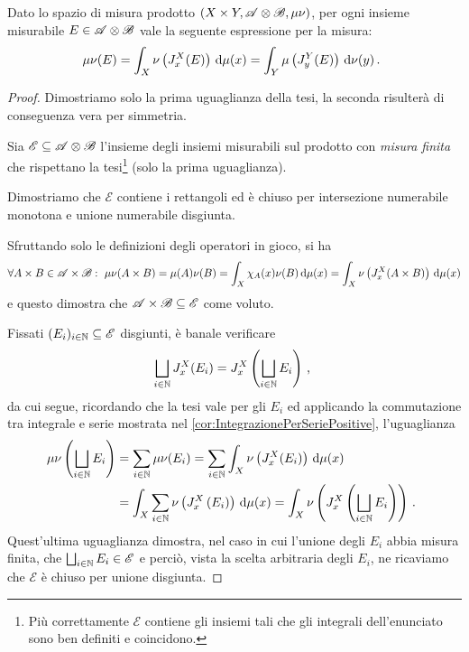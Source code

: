 \begin{proposition}\label{prop:PreTonelli}
	Dato lo spazio di misura prodotto $(X\times Y,\mathscr A\otimes\mathscr B,\mu\nu)$, per ogni insieme misurabile $E\in\mathscr A\otimes\mathscr B$ \sigfin[o] vale la seguente espressione per la misura:
	\begin{equation*}
		\mu\nu(E)=\int_X\nu\left(J_x^X(E)\right)\,\mathrm d\mu(x)=\int_Y\mu\left(J_y^Y(E)\right)\,\mathrm d\nu(y)\, \text{. }
	\end{equation*}
\end{proposition}
\begin{proof}
	\newcommand{\E}{\ensuremath{\mathscr E}}
	Dimostriamo solo la prima uguaglianza della tesi, la seconda risulterà di conseguenza vera per simmetria.
	
	Sia $\E\subseteq \A\otimes\B$ l'insieme degli insiemi misurabili sul prodotto con \emph{misura finita} che rispettano la tesi\footnote{Più correttamente $\E$ contiene gli insiemi tali che gli integrali dell'enunciato sono ben definiti e coincidono.} (solo la prima uguaglianza).
	
	Dimostriamo che $\E$ contiene i rettangoli ed è chiuso per intersezione numerabile monotona e unione numerabile disgiunta.
	
	Sfruttando solo le definizioni degli operatori in gioco, si ha
	\begin{equation*}
		\forall A\times B\in\mathscr A\times\mathscr B:\ \mu\nu(A\times B)=\mu(A)\nu(B)=\int_X \chi_A(x)\nu(B)\,\mathrm d\mu(x)=\int_X\nu\left(J_x^X(A\times B)\right)\,\mathrm d\mu(x)
	\end{equation*}
	e questo dimostra che $\A\times\B\subseteq \E$ come voluto.
	
	Fissati $(E_i)_{i\in\N}\subseteq \E$ disgiunti, è banale verificare
	\begin{equation*}
		\bigsqcup_{i\in\mathbb N}J_x^X(E_i)=J_x^X\left(\bigsqcup_{i\in\mathbb N}E_i\right)\, \text{, }
	\end{equation*}
	da cui segue, ricordando che la tesi vale per gli $E_i$ ed applicando la commutazione tra integrale e serie mostrata nel \cref{cor:IntegrazionePerSeriePositive}, l'uguaglianza
	\begin{align*}
		\mu\nu\left(\bigsqcup_{i\in\mathbb N}E_i\right)&=\sum_{i\in\mathbb N}\mu\nu(E_i)=\sum_{i\in\mathbb N}\int_X \nu\left(J_x^X(E_i)\right)\,\mathrm d\mu(x)\\
		&=\int_X\sum_{i\in\mathbb N}\nu\left(J_x^X\left(E_i\right)\right)\,\mathrm d\mu(x)=\int_X\nu\left(J_x^X\left(\bigsqcup_{i\in\mathbb N}E_i\right)\right)\, \text{. }
	\end{align*}
	Quest'ultima uguaglianza dimostra, nel caso in cui l'unione degli $E_i$ abbia misura finita, che $\bigsqcup_{i\in\N}E_i\in\E$ e perciò, vista la scelta arbitraria degli $E_i$, ne ricaviamo che $\E$ è chiuso per unione disgiunta.
	

\end{proof}
